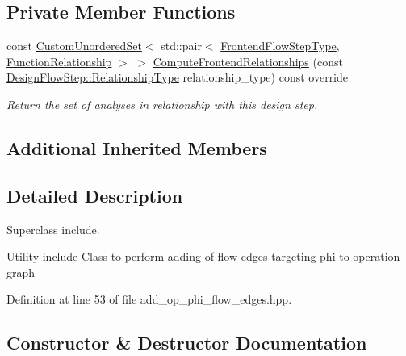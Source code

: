 \subsection*{Private Member Functions}
\begin{DoxyCompactItemize}
\item 
const \hyperlink{classCustomUnorderedSet}{Custom\+Unordered\+Set}$<$ std\+::pair$<$ \hyperlink{frontend__flow__step_8hpp_afeb3716c693d2b2e4ed3e6d04c3b63bb}{Frontend\+Flow\+Step\+Type}, \hyperlink{classFrontendFlowStep_af7cf30f2023e5b99e637dc2058289ab0}{Function\+Relationship} $>$ $>$ \hyperlink{classAddOpPhiFlowEdges_a70d4933aac7528718424678981aac9ea}{Compute\+Frontend\+Relationships} (const \hyperlink{classDesignFlowStep_a723a3baf19ff2ceb77bc13e099d0b1b7}{Design\+Flow\+Step\+::\+Relationship\+Type} relationship\+\_\+type) const override
\begin{DoxyCompactList}\small\item\em Return the set of analyses in relationship with this design step. \end{DoxyCompactList}\end{DoxyCompactItemize}
\subsection*{Additional Inherited Members}


\subsection{Detailed Description}
Superclass include. 

Utility include Class to perform adding of flow edges targeting phi to operation graph 

Definition at line 53 of file add\+\_\+op\+\_\+phi\+\_\+flow\+\_\+edges.\+hpp.



\subsection{Constructor \& Destructor Documentation}
\mbox{\label{classAddOpPhiFlowEdges_a3347740ebc741fae8e3d85f173676cab}} 
